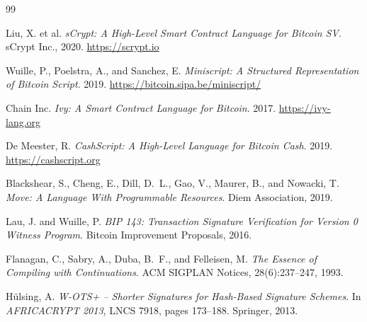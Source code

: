 \documentclass[11pt,a4paper]{article}
\begin{document}

\begin{thebibliography}{99}

Liu, X. et al.
\textit{sCrypt: A High-Level Smart Contract Language for Bitcoin SV}.
sCrypt Inc., 2020.
\url{https://scrypt.io}

Wuille, P., Poelstra, A., and Sanchez, E.
\textit{Miniscript: A Structured Representation of Bitcoin Script}.
2019.
\url{https://bitcoin.sipa.be/miniscript/}

Chain Inc.
\textit{Ivy: A Smart Contract Language for Bitcoin}.
2017.
\url{https://ivy-lang.org}

De Meester, R.
\textit{CashScript: A High-Level Language for Bitcoin Cash}.
2019.
\url{https://cashscript.org}

Blackshear, S., Cheng, E., Dill, D.~L., Gao, V., Maurer, B., and Nowacki, T.
\textit{Move: A Language With Programmable Resources}.
Diem Association, 2019.

Lau, J. and Wuille, P.
\textit{BIP 143: Transaction Signature Verification for Version 0 Witness Program}.
Bitcoin Improvement Proposals, 2016.

Flanagan, C., Sabry, A., Duba, B.~F., and Felleisen, M.
\textit{The Essence of Compiling with Continuations}.
ACM SIGPLAN Notices, 28(6):237--247, 1993.

H{\"u}lsing, A.
\textit{W-OTS+ -- Shorter Signatures for Hash-Based Signature Schemes}.
In \textit{AFRICACRYPT 2013}, LNCS 7918, pages 173--188. Springer, 2013.

\end{thebibliography}
\end{document}

